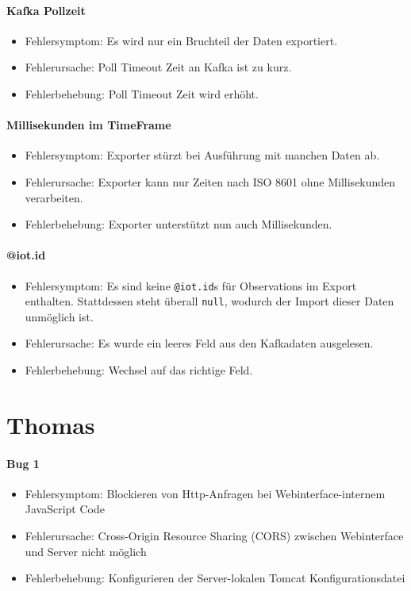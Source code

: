 \paragraph{Kafka Pollzeit}
\begin{itemize}
	\item Fehlersymptom: Es wird nur ein Bruchteil der Daten exportiert.
	\item Fehlerursache: Poll Timeout Zeit an Kafka ist zu kurz.
	\item Fehlerbehebung: Poll Timeout Zeit wird erhöht.
\end{itemize}

\paragraph{Millisekunden im TimeFrame}
\begin{itemize}
	\item Fehlersymptom: Exporter stürzt bei Ausführung mit manchen Daten ab.
	\item Fehlerursache: Exporter kann nur Zeiten nach ISO 8601 ohne Millisekunden verarbeiten.
	\item Fehlerbehebung: Exporter unterstützt nun auch Millisekunden.
\end{itemize}

\paragraph{@iot.id}
\begin{itemize}
	\item Fehlersymptom: Es sind keine \texttt{@iot.id}s für Observations im Export enthalten. Stattdessen steht überall \texttt{null}, wodurch der Import dieser Daten unmöglich ist.
	\item Fehlerursache: Es wurde ein leeres Feld aus den Kafkadaten ausgelesen.
	\item Fehlerbehebung: Wechsel auf das richtige Feld.
\end{itemize}
\newpage
\section{Thomas}
\paragraph{Bug 1}
\begin{itemize}
	\item Fehlersymptom: Blockieren von Http-Anfragen bei Webinterface-internem JavaScript Code
	\item Fehlerursache: Cross-Origin Resource Sharing (CORS) zwischen Webinterface und Server nicht möglich
	\item Fehlerbehebung: Konfigurieren der Server-lokalen Tomcat Konfigurationsdatei
\end{itemize}

